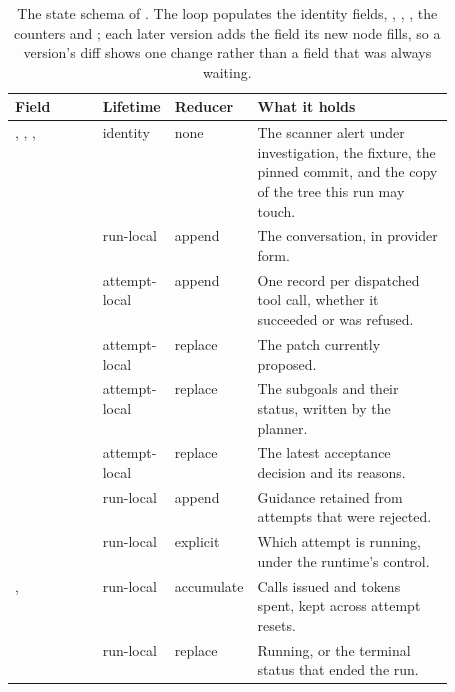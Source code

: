 \begin{table}[tbp]
  \centering
  \begin{adjustbox}{width=\linewidth}\begin{tabularx}{\linewidth}{@{}L{0.20\linewidth}L{0.155\linewidth}L{0.155\linewidth}X@{}}
    \toprule
    \textbf{Field} & \textbf{Lifetime} & \textbf{Reducer} & \textbf{What it holds} \\
    \midrule
    , , , 
      & identity & none & The scanner alert under investigation, the fixture, the
        pinned commit, and the copy of the tree this run may touch. \\
     & run-local & append & The conversation, in provider form. \\
     & attempt-local & append & One record per dispatched tool call, whether
      it succeeded or was refused. \\
     & attempt-local & replace & The patch currently proposed. \\
     & attempt-local & replace & The subgoals and their status, written by the
      planner. \\
     & attempt-local & replace & The latest acceptance decision and its
      reasons. \\
     & run-local & append & Guidance retained from attempts that were
      rejected. \\
     & run-local & explicit & Which attempt is running, under the runtime's
      control. \\
    ,  & run-local & accumulate & Calls issued and tokens
      spent, kept across attempt resets. \\
     & run-local & replace & Running, or the terminal status that ended the run. \\
    \bottomrule
  \end{tabularx}\end{adjustbox}
  \caption{The state schema of . The loop populates the identity fields,
  , , , the counters and
  ; each later version adds the field its new node fills, so a version's diff shows
  one change rather than a field that was always waiting.}
  \label{tab:state-fields}
\end{table}

